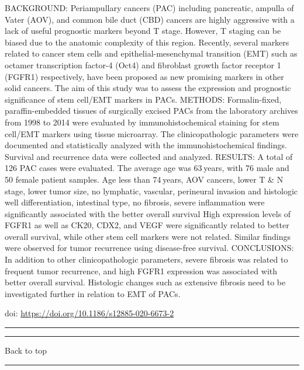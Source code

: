 \documentclass[
]{article}
\begin{document}
BACKGROUND: Periampullary cancers (PAC) including pancreatic, ampulla of
Vater (AOV), and common bile duct (CBD) cancers are highly aggressive
with a lack of useful prognostic markers beyond T stage. However, T
staging can be biased due to the anatomic complexity of this region.
Recently, several markers related to cancer stem cells and
epithelial-mesenchymal transition (EMT) such as octamer transcription
factor-4 (Oct4) and fibroblast growth factor receptor 1 (FGFR1)
respectively, have been proposed as new promising markers in other solid
cancers. The aim of this study was to assess the expression and
prognostic significance of stem cell/EMT markers in PACs. METHODS:
Formalin-fixed, paraffin-embedded tissues of surgically excised PACs
from the laboratory archives from 1998 to 2014 were evaluated by
immunohistochemical staining for stem cell/EMT markers using tissue
microarray. The clinicopathologic parameters were documented and
statistically analyzed with the immunohistochemical findings. Survival
and recurrence data were collected and analyzed. RESULTS: A total of 126
PAC cases were evaluated. The average age was 63 years, with 76 male and
50 female patient samples. Age less than 74 years, AOV cancers, lower T
\& N stage, lower tumor size, no lymphatic, vascular, perineural
invasion and histologic well differentiation, intestinal type, no
fibrosis, severe inflammation were significantly associated with the
better overall survival High expression levels of FGFR1 as well as CK20,
CDX2, and VEGF were significantly related to better overall survival,
while other stem cell markers were not related. Similar findings were
observed for tumor recurrence using disease-free survival. CONCLUSIONS:
In addition to other clinicopathologic parameters, severe fibrosis was
related to frequent tumor recurrence, and high FGFR1 expression was
associated with better overall survival. Histologic changes such as
extensive fibrosis need to be investigated further in relation to EMT of
PACs.

doi: \url{https://doi.org/10.1186/s12885-020-6673-2}

\begin{center}\rule{0.5\linewidth}{0.5pt}\end{center}

\begin{center}\rule{0.5\linewidth}{0.5pt}\end{center}

Back to top

\begin{center}\rule{0.5\linewidth}{0.5pt}\end{center}
\end{document}
